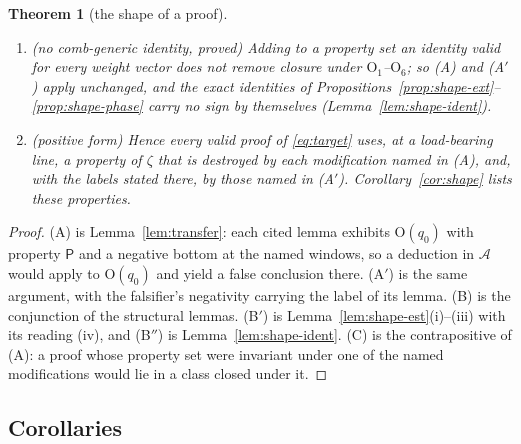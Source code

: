 \documentclass[11pt]{amsart}
\newtheorem{theorem}{Theorem}[section]
\theoremstyle{definition}
\theoremstyle{remark}
\newcommand{\lamA}{\lambda_{\mathrm A}(T)}
\newcommand{\Aconst}{\mathsf A_T}
\begin{document}
\begin{theorem}[the shape of a proof]
\begin{enumerate}
\S\ref{subsec:shape-est}, has main term and remainder equal to within $4\cdot10^9Te^{-15.449T}$, and every exact reduction by
Lemma~\ref{lem:wh-schurabs} with $\lambda_S<c_{\mathcal X}$ passes this precision to the reduced form up to the factor $(1+\|\mathsf K\|)^2$ (proved); if $\kappa_T\ne0$, an
estimate whose slack exceeds $\Aconst\lamA/|\kappa_T|$ admits the falsifier $(1+\delta)\Lambda$ (conditional). That no estimate with a
remainder carries the sign step is argued (Lemma~\ref{lem:shape-est}).
\item[(B$''$)] \textup{(no comb-generic identity, proved)} Adding to a property set an identity valid for every weight vector does not remove
closure under $\mathrm O_1$--$\mathrm O_6$; so (A) and (A$'$) apply unchanged, and the exact identities of
Propositions~\ref{prop:shape-ext}--\ref{prop:shape-phase} carry no sign by themselves (Lemma~\ref{lem:shape-ident}).
\item[(C)] \textup{(positive form)} Hence every valid proof of \eqref{eq:target} uses, at a load-bearing line, a property of $\zeta$ that
is destroyed by each modification named in (A), and, with the labels stated there, by those named in (A$'$). Corollary~\ref{cor:shape}
lists these properties.
\end{enumerate}
\end{theorem}
\begin{proof}
(A) is Lemma~\ref{lem:transfer}: each cited lemma exhibits $\mathrm O(q_0)$ with property $\mathsf P$ and a negative bottom at the named
windows, so a deduction in $\mathcal A$ would apply to $\mathrm O(q_0)$ and yield a false conclusion there. (A$'$) is the same argument,
with the falsifier's negativity carrying the label of its lemma. (B) is the conjunction of the structural lemmas. (B$'$) is Lemma~\ref{lem:shape-est}(i)--(iii) with its reading (iv),
and (B$''$) is Lemma~\ref{lem:shape-ident}. (C) is the contrapositive of (A): a proof whose property set were invariant under one of the named modifications would lie in a class closed under
it.
\end{proof}

\subsection{Corollaries}
\end{document}
